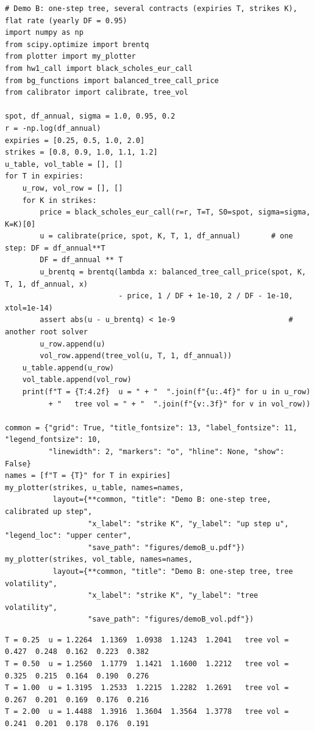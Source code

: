 \documentclass[11pt,a4paper]{article}
\begin{document}
\par\smallskip\noindent\begin{minipage}{\linewidth}\begin{lstlisting}[style=pysmall,title={Demo B (\texttt{demo\_B.py})}]
# Demo B: one-step tree, several contracts (expiries T, strikes K), flat rate (yearly DF = 0.95)
import numpy as np
from scipy.optimize import brentq
from plotter import my_plotter
from hw1_call import black_scholes_eur_call
from bg_functions import balanced_tree_call_price
from calibrator import calibrate, tree_vol

spot, df_annual, sigma = 1.0, 0.95, 0.2
r = -np.log(df_annual)
expiries = [0.25, 0.5, 1.0, 2.0]
strikes = [0.8, 0.9, 1.0, 1.1, 1.2]
u_table, vol_table = [], []
for T in expiries:
    u_row, vol_row = [], []
    for K in strikes:
        price = black_scholes_eur_call(r=r, T=T, S0=spot, sigma=sigma, K=K)[0]
        u = calibrate(price, spot, K, T, 1, df_annual)       # one step: DF = df_annual**T
        DF = df_annual ** T
        u_brentq = brentq(lambda x: balanced_tree_call_price(spot, K, T, 1, df_annual, x)
                          - price, 1 / DF + 1e-10, 2 / DF - 1e-10, xtol=1e-14)
        assert abs(u - u_brentq) < 1e-9                          # another root solver
        u_row.append(u)
        vol_row.append(tree_vol(u, T, 1, df_annual))
    u_table.append(u_row)
    vol_table.append(vol_row)
    print(f"T = {T:4.2f}  u = " + "  ".join(f"{u:.4f}" for u in u_row)
          + "   tree vol = " + "  ".join(f"{v:.3f}" for v in vol_row))

common = {"grid": True, "title_fontsize": 13, "label_fontsize": 11, "legend_fontsize": 10,
          "linewidth": 2, "markers": "o", "hline": None, "show": False}
names = [f"T = {T}" for T in expiries]
my_plotter(strikes, u_table, names=names,
           layout={**common, "title": "Demo B: one-step tree, calibrated up step",
                   "x_label": "strike K", "y_label": "up step u", "legend_loc": "upper center",
                   "save_path": "figures/demoB_u.pdf"})
my_plotter(strikes, vol_table, names=names,
           layout={**common, "title": "Demo B: one-step tree, tree volatility",
                   "x_label": "strike K", "y_label": "tree volatility",
                   "save_path": "figures/demoB_vol.pdf"})
\end{lstlisting}
\begin{lstlisting}[style=out,title={output (\texttt{demo\_B.out}; per row: $u$ for $K = 0.8, \dots, 1.2$, then the tree volatilities)}]
T = 0.25  u = 1.2264  1.1369  1.0938  1.1243  1.2041   tree vol = 0.427  0.248  0.162  0.223  0.382
T = 0.50  u = 1.2560  1.1779  1.1421  1.1600  1.2212   tree vol = 0.325  0.215  0.164  0.190  0.276
T = 1.00  u = 1.3195  1.2533  1.2215  1.2282  1.2691   tree vol = 0.267  0.201  0.169  0.176  0.216
T = 2.00  u = 1.4488  1.3916  1.3604  1.3564  1.3778   tree vol = 0.241  0.201  0.178  0.176  0.191
\end{lstlisting}\end{minipage}\par\smallskip
\end{document}
